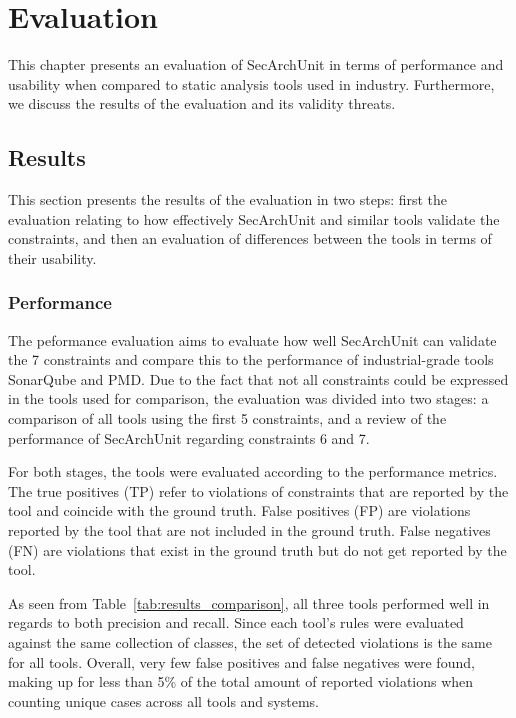 \chapter{Evaluation}

This chapter presents an evaluation of SecArchUnit in terms of performance and usability when compared to static analysis tools used in industry. Furthermore, we discuss the results of the evaluation and its validity threats.

\section{Results}
This section presents the results of the evaluation in two steps: first the evaluation relating to how effectively SecArchUnit and similar tools validate the constraints, and then an evaluation of differences between the tools in terms of their usability.

\subsection{Performance}
The peformance evaluation aims to evaluate how well SecArchUnit can validate the 7 constraints and compare this to the performance of industrial-grade tools SonarQube and PMD. Due to the fact that not all constraints could be expressed in the tools used for comparison, the evaluation was divided into two stages: a comparison of all tools using the first 5 constraints, and a review of the performance of SecArchUnit regarding constraints 6 and 7.

For both stages, the tools were evaluated according to the performance metrics. The true positives (TP) refer to violations of constraints that are reported by the tool and coincide with the ground truth. False positives (FP) are violations reported by the tool that are not included in the ground truth. False negatives (FN) are violations that exist in the ground truth but do not get reported by the tool. 



As seen from Table~\ref{tab:results_comparison}, all three tools performed well in regards to both precision and recall. Since each tool's rules were evaluated against the same collection of classes, the set of detected violations is the same for all tools. Overall, very few false positives and false negatives were found, making up for less than 5\% of the total amount of reported violations when counting unique cases across all tools and systems. 

